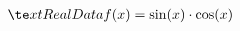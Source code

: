 \documentclass[preview]{standalone}
\begin{document}
\begin{align*}
\te x t{Real Data } f( x ) = \sin( x ) \cdot \cos( x )
\end{align*}
\end{document}
